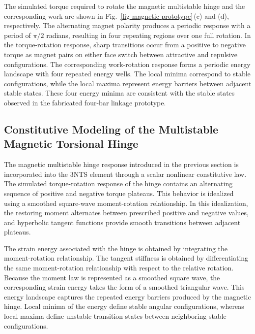 The simulated torque required to rotate the magnetic multistable hinge and the corresponding work are shown in Fig.~\ref{fig-magnetic-prototype}\,(c) and (d), respectively. The alternating magnet polarity produces a periodic response with a period of \(\pi/2\) radians, resulting in four repeating regions over one full rotation. In the torque-rotation response, sharp transitions occur from a positive to negative torque as magnet pairs on either face switch between attractive and repulsive configurations. The corresponding work-rotation response forms a periodic energy landscape with four repeated energy wells. The local minima correspond to stable configurations, while the local maxima represent energy barriers between adjacent stable states. These four energy minima are consistent with the stable states observed in the fabricated four-bar linkage prototype.

\subsection{Constitutive Modeling of the Multistable Magnetic Torsional Hinge}\label{04-subsec-magnetic-hinge-model}
The magnetic multistable hinge response introduced in the previous section is incorporated into the 3NTS element through a scalar nonlinear constitutive law. The simulated torque-rotation response of the hinge contains an alternating sequence of positive and negative torque plateaus. This behavior is idealized using a smoothed square-wave moment-rotation relationship. In this idealization, the restoring moment alternates between prescribed positive and negative values, and hyperbolic tangent functions provide smooth transitions between adjacent plateaus.

The strain energy associated with the hinge is obtained by integrating the moment-rotation relationship. The tangent stiffness is obtained by differentiating the same moment-rotation relationship with respect to the relative rotation. Because the moment law is represented as a smoothed square wave, the corresponding strain energy takes the form of a smoothed triangular wave. This energy landscape captures the repeated energy barriers produced by the magnetic hinge. Local minima of the energy define stable angular configurations, whereas local maxima define unstable transition states between neighboring stable configurations.

